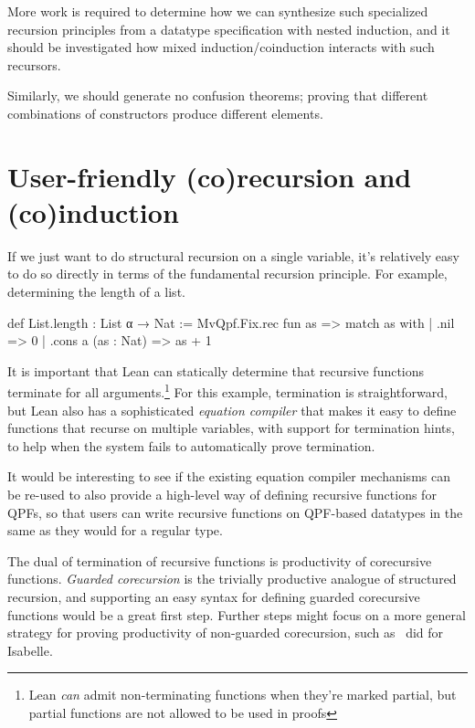 More work is required to determine how we can synthesize such specialized recursion principles from
a datatype specification with nested induction, and it should be investigated how mixed induction/coinduction
interacts with such recursors.

Similarly, we should generate no confusion theorems; proving that different combinations of constructors
produce different elements.




\section{User-friendly (co)recursion and (co)induction}
If we just want to do structural recursion on a single variable, it's relatively easy to do so directly
in terms of the fundamental recursion principle.
For example, determining the length of a list.
\begin{leancode}
def List.length : List α → Nat :=
  MvQpf.Fix.rec fun as => match as with
    | .nil                => 0
    | .cons a (as : Nat)  => as + 1 
\end{leancode}

It is important that Lean can statically determine that recursive functions terminate for all 
arguments.\footnote{Lean \emph{can} admit non-terminating functions when they're marked partial, but partial functions are not allowed to be used in proofs}
For this example, termination is straightforward,
but Lean also has a sophisticated \emph{equation compiler} that makes it easy to define functions that recurse
on multiple variables, with support for termination hints, to help when the system fails to automatically prove termination.

It would be interesting to see if the existing equation compiler mechanisms can be re-used
to also provide a high-level way of defining recursive functions for QPFs, so that users can write
recursive functions on QPF-based datatypes in the same as they would for a regular \inductive{} type.

The dual of termination of recursive functions is productivity of corecursive functions.
\emph{Guarded corecursion} is the trivially productive analogue of structured recursion, 
and supporting an easy syntax for defining guarded corecursive functions would be a great first step.
Further steps might focus on a more general strategy for proving productivity of non-guarded corecursion,
such as~\cite{blanchetteFriendsBenefitsImplementing2017} did for Isabelle.

